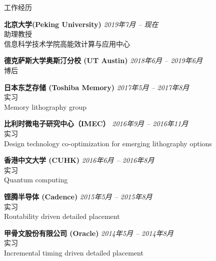 
\begin{rSection}{工作经历}

{\bf 北京大学(Peking University)}                           \hfill {\em 2019年7月 -- 现在} \\
助理教授 \\
信息科学技术学院高能效计算与应用中心

{\bf 德克萨斯大学奥斯汀分校 (UT Austin)}                           \hfill {\em 2018年6月 -- 2019年6月} \\
博后

{\bf 日本东芝存储 (Toshiba Memory) }                           \hfill {\em 2017年5月 -- 2017年8月} \\
实习 \\
Memory lithography group

{\bf 比利时微电子研究中心（IMEC）}                           \hfill {\em 2016年9月 -- 2016年11月} \\
实习 \\
Design technology co-optimization for emerging lithography options

{\bf 香港中文大学 (CUHK)}                           \hfill {\em 2016年6月 -- 2016年8月} \\
实习 \\
Quantum computing

{\bf 铿腾半导体 (Cadence)}                           \hfill {\em 2015年5月 -- 2015年8月} \\
实习 \\
Routability driven detailed placement

{\bf 甲骨文股份有限公司 (Oracle)}                           \hfill {\em 2014年5月 -- 2014年8月} \\
实习 \\
Incremental timing driven detailed placement


\end{rSection}


